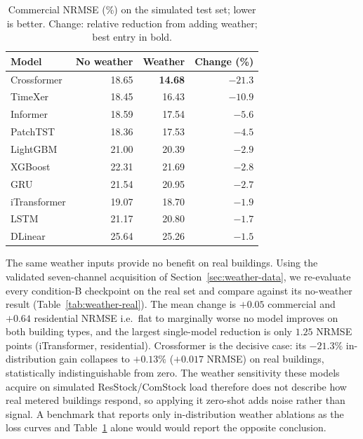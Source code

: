 \documentclass[11pt]{article}
\begin{document}
\begin{table}[H]
\centering
\begin{tabular}{lrrr}
\toprule
Model & No weather & Weather & Change (\%) \\
\midrule
Crossformer  & 18.65 & \textbf{14.68} & $-21.3$ \\
TimeXer      & 18.45 & 16.43 & $-10.9$ \\
Informer     & 18.59 & 17.54 & $-5.6$ \\
PatchTST     & 18.36 & 17.53 & $-4.5$ \\
LightGBM     & 21.00 & 20.39 & $-2.9$ \\
XGBoost      & 22.31 & 21.69 & $-2.8$ \\
GRU          & 21.54 & 20.95 & $-2.7$ \\
iTransformer & 19.07 & 18.70 & $-1.9$ \\
LSTM         & 21.17 & 20.80 & $-1.7$ \\
DLinear      & 25.64 & 25.26 & $-1.5$ \\
\bottomrule
\end{tabular}
\caption{Commercial NRMSE (\%) on the simulated test set; lower is better.
Change: relative reduction from adding weather; best entry in bold.}
\label{tab:weather}
\end{table}

The same weather inputs provide no benefit on real buildings. Using the validated
seven-channel acquisition of Section~\ref{sec:weather-data}, we re-evaluate every
condition-B checkpoint on the real set and compare against its no-weather result
(Table~\ref{tab:weather-real}). The mean change is $+0.05$ commercial and $+0.64$
residential NRMSE i.e.\ flat to marginally worse no model improves on both
building types, and the largest single-model reduction is only $1.25$ NRMSE points
(iTransformer, residential). Crossformer is the decisive case: its
$-21.3\%$ in-distribution gain collapses to $+0.13\%$ ($+0.017$ NRMSE) on real
buildings, statistically indistinguishable from zero. The weather sensitivity these
models acquire on simulated ResStock/ComStock load therefore does not describe how
real metered buildings respond, so applying it zero-shot adds noise rather than
signal. A benchmark that reports only in-distribution weather ablations as the
loss curves and Table~\ref{tab:weather} alone would would report the opposite
conclusion.
\end{document}
